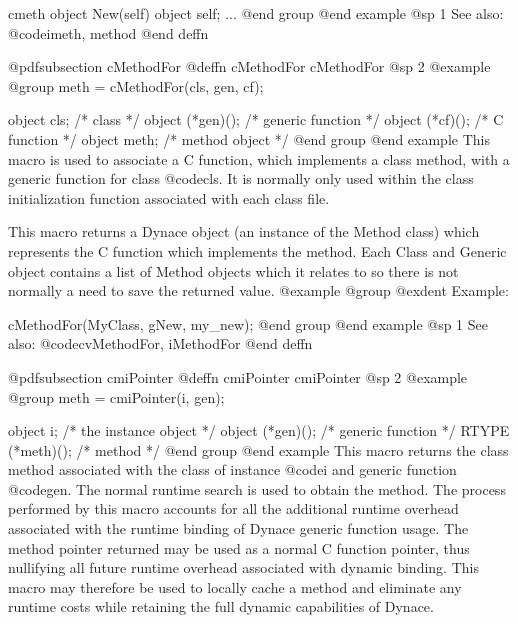 {{{{cmeth object  New(self)
object self;
{
        ...
}
@end group
@end example
@sp 1
See also:  @code{imeth, method}
@end deffn














@pdfsubsection {cMethodFor}
@deffn {cMethodFor} cMethodFor
@sp 2
@example
@group
meth = cMethodFor(cls, gen, cf);

object  cls;            /*  class               */
object  (*gen)();       /*  generic function    */
object  (*cf)();        /*  C function          */
object  meth;           /*  method object       */
@end group
@end example
This macro is used to associate a C function, which implements a class
method, with a generic function for class @code{cls}. It is normally only
used within the class initialization function associated with each class
file.

This macro returns a Dynace object (an instance of the Method class) which
represents the C function which implements the method.  Each Class 
and Generic object contains a list of Method objects which it relates
to so there is not normally a need to save the returned value.
@example
@group
@exdent Example:

cMethodFor(MyClass, gNew, my_new);
@end group
@end example
@sp 1
See also:  @code{cvMethodFor, iMethodFor}
@end deffn

















@pdfsubsection {cmiPointer}
@deffn {cmiPointer} cmiPointer
@sp 2
@example
@group
meth = cmiPointer(i, gen);

object  i;              /*  the instance object */
object  (*gen)();       /*  generic function    */
RTYPE   (*meth)();      /*  method              */
@end group
@end example
This macro returns the class method associated with the class of
instance @code{i} and generic function @code{gen}.  The normal runtime
search is used to obtain the method.  The process performed by this
macro accounts for all the additional runtime overhead associated with
the runtime binding of Dynace generic function usage.  The method pointer
returned may be used as a normal C function pointer, thus nullifying all
future runtime overhead associated with dynamic binding.  This macro may
therefore be used to locally cache a method and eliminate any runtime
costs while retaining the full dynamic capabilities of Dynace.

}}}}
